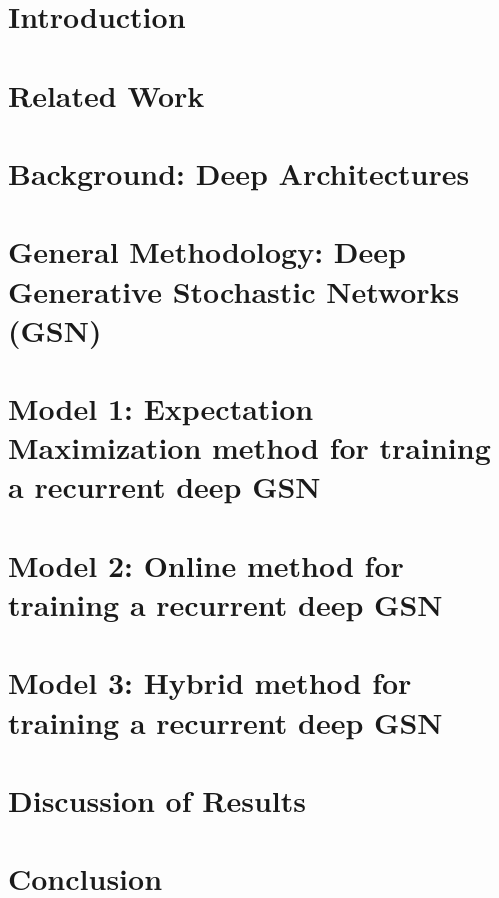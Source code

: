 \documentclass[12pt, titlepage]{report}
\begin{document}
	\tableofcontents
	\listoffigures
	\listoftables
	
	\chapter{Introduction}
	
	
	\chapter{Related Work}
	
	
	\chapter{Background: Deep Architectures}
	
	
	\chapter{General Methodology: Deep Generative Stochastic Networks (GSN)}
	
	
	\chapter{Model 1: Expectation Maximization method for training a recurrent deep GSN}
	
	
	\chapter{Model 2: Online method for training a recurrent deep GSN}	
	

	\chapter{Model 3: Hybrid method for training a recurrent deep GSN}	
	
	
	\chapter{Discussion of Results}
	
	
	\chapter{Conclusion}
	
	
	
	
\end{document}
